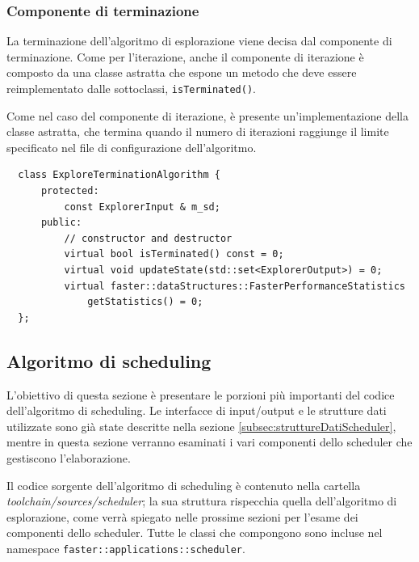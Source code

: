 \subsubsection{Componente di terminazione}
La terminazione dell'algoritmo di esplorazione viene decisa dal componente di 
terminazione. Come per l'iterazione, anche il componente di iterazione è 
composto da una classe astratta che espone un metodo che deve essere 
reimplementato dalle sottoclassi, \verb+isTerminated()+.

Come nel caso del componente di iterazione, è presente un'implementazione della 
classe astratta, che termina quando il numero di iterazioni raggiunge il limite 
specificato nel file di configurazione dell'algoritmo.
\newline
\begin{verbatim}
  class ExploreTerminationAlgorithm {
      protected:
          const ExplorerInput & m_sd;
      public:
          // constructor and destructor
          virtual bool isTerminated() const = 0;
          virtual void updateState(std::set<ExplorerOutput>) = 0;
          virtual faster::dataStructures::FasterPerformanceStatistics 
              getStatistics() = 0;
  };
\end{verbatim}


\subsection{Algoritmo di scheduling}
\label{subsec:algoritmoScheduling}
L'obiettivo di questa sezione è presentare le porzioni più importanti del 
codice dell'algoritmo di scheduling. Le interfacce di input/output e le 
strutture dati utilizzate sono già state descritte nella sezione 
\ref{subsec:struttureDatiScheduler}, mentre in questa sezione verranno esaminati i 
vari componenti dello scheduler che gestiscono l'elaborazione.

Il codice sorgente dell'algoritmo di scheduling è contenuto nella cartella 
\emph{toolchain/sources/scheduler}; la sua struttura rispecchia quella 
dell'algoritmo di esplorazione, come verrà spiegato nelle prossime sezioni per 
l'esame dei componenti dello scheduler. Tutte le classi che compongono 
sono incluse nel namespace \verb+faster::applications::scheduler+.

